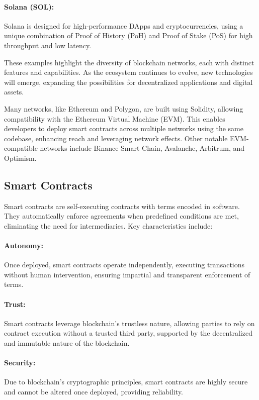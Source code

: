 \paragraph{Solana (SOL):}
Solana is designed for high-performance DApps and cryptocurrencies, using a
unique combination of Proof of History (PoH) and Proof of Stake (PoS) for high
throughput and low latency.

These examples highlight the diversity of blockchain networks, each with
distinct features and capabilities. As the ecosystem continues to evolve, new
technologies will emerge, expanding the possibilities for decentralized
applications and digital assets.

Many networks, like Ethereum and Polygon, are built using Solidity, allowing
compatibility with the Ethereum Virtual Machine (EVM). This enables developers
to deploy smart contracts across multiple networks using the same codebase,
enhancing reach and leveraging network effects. Other notable EVM-compatible
networks include Binance Smart Chain, Avalanche, Arbitrum, and Optimism.

\subsection{Smart Contracts}
\label{subsec:smart_contracts}

Smart contracts are self-executing contracts with terms encoded in software.
They automatically enforce agreements when predefined conditions are met,
eliminating the need for intermediaries. Key characteristics include:

\paragraph{Autonomy:}
Once deployed, smart contracts operate independently, executing transactions
without human intervention, ensuring impartial and transparent enforcement of
terms.

\paragraph{Trust:}
Smart contracts leverage blockchain's trustless nature, allowing parties to
rely on contract execution without a trusted third party, supported by the
decentralized and immutable nature of the blockchain.

\paragraph{Security:}
Due to blockchain's cryptographic principles, smart contracts are highly secure
and cannot be altered once deployed, providing reliability.

